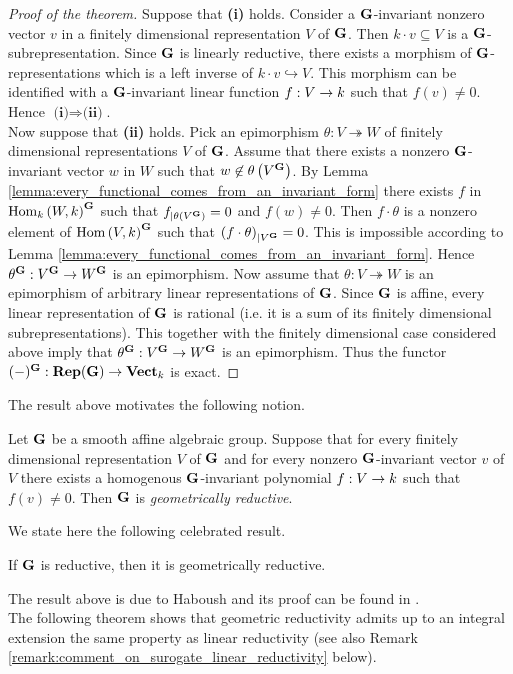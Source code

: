 \begin{proof}[Proof of the theorem]
Suppose that \textbf{(i)} holds. Consider a $\mathbf{G}$-invariant nonzero vector $v$ in a finitely dimensional representation $V$ of $\mathbf{G}$. Then $k\cdot v\subseteq V$ is a $\mathbf{G}$-subrepresentation. Since $\mathbf{G}$ is linearly reductive, there exists a morphism of $\mathbf{G}$-representations which is a left inverse of $k\cdot v \hookrightarrow V$. This morphism can be identified with a $\mathbf{G}$-invariant linear function $f:V\rightarrow k$ such that $f(v) \neq 0$. Hence $\textbf{(i)}\Rightarrow \textbf{(ii)}$.\\
Now suppose that \textbf{(ii)} holds. Pick an epimorphism $\theta:V\twoheadrightarrow W$ of finitely dimensional representations $V$ of $\mathbf{G}$. Assume that there exists a nonzero $\mathbf{G}$-invariant vector $w$ in $W$ such that $w\not \in \theta\left(V^{\mathbf{G}}\right)$. By Lemma \ref{lemma:every_functional_comes_from_an_invariant_form} there exists $f$ in $\mathrm{Hom}_k\left(W,k\right)^{\mathbf{G}}$ such that $f_{\mid \theta\left(V^{\mathbf{G}}\right)} = 0$ and $f(w) \neq 0$. Then $f\cdot \theta$ is a nonzero element of $\mathrm{Hom}\left(V,k\right)^{\mathbf{G}}$ such that $\left(f\cdot \theta\right)_{\mid V^{\mathbf{G}}} = 0$. This is impossible according to Lemma \ref{lemma:every_functional_comes_from_an_invariant_form}. Hence $\theta^{\mathbf{G}}:V^{\mathbf{G}}\rightarrow W^{\mathbf{G}}$ is an epimorphism. Now assume that $\theta:V\twoheadrightarrow W$ is an epimorphism of arbitrary linear representations of $\mathbf{G}$. Since $\mathbf{G}$ is affine, every linear representation of $\mathbf{G}$ is rational (i.e. it is a sum of its finitely dimensional subrepresentations). This together with the finitely dimensional case considered above imply that $\theta^{\mathbf{G}}:V^{\mathbf{G}}\rightarrow W^{\mathbf{G}}$ is an epimorphism. Thus the functor $(-)^{\mathbf{G}}:\mathbf{Rep}(\mathbf{G})\rightarrow \mathbf{Vect}_k$ is exact.
\end{proof}
\noindent
The result above motivates the following notion.

\begin{definition}
Let $\mathbf{G}$ be a smooth affine algebraic group. Suppose that for every finitely dimensional representation $V$ of $\mathbf{G}$ and for every nonzero $\mathbf{G}$-invariant vector $v$ of $V$ there exists a homogenous $\mathbf{G}$-invariant polynomial $f:V\rightarrow k$ such that $f(v)\neq 0$. Then $\mathbf{G}$ is \textit{geometrically reductive}.     
\end{definition}
\noindent
We state here the following celebrated result.

\begin{theorem}\label{theorem:haboush_theorem}
If $\mathbf{G}$ is reductive, then it is geometrically reductive.
\end{theorem}
\noindent
The result above is due to Haboush and its proof can be found in \cite{Haboush_reductive_is_geom_reductive}.\\
The following theorem shows that geometric reductivity admits up to an integral extension the same property as linear reductivity (see also Remark \ref{remark:comment_on_surogate_linear_reductivity} below).

